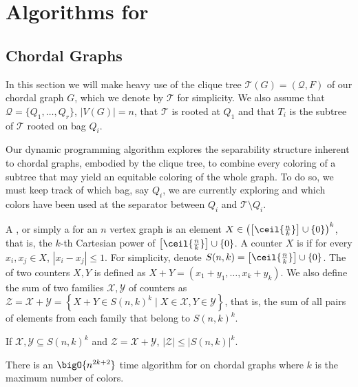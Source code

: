 \section{Algorithms for }

\subsection{Chordal Graphs}

In this section we will make heavy use of the clique tree $\mathcal{T}(G) = (\mathcal{Q}, F)$ of our chordal graph $G$, which we denote by $\mathcal{T}$ for simplicity.
We also assume that $\mathcal{Q} = \{Q_1, \dots, Q_r\}$, $|V(G)| = n$, that $\mathcal{T}$ is rooted at $Q_1$ and that $T_i$ is the subtree of $\mathcal{T}$ rooted on bag $Q_i$.

Our dynamic programming algorithm explores the separability structure inherent to chordal graphs, embodied by the clique tree, to combine every coloring of a subtree that may yield an equitable coloring of the whole graph.
To do so, we must keep track of which bag, say $Q_i$, we are currently exploring and which colors have been used at the separator between $Q_i$ and $\mathcal{T} \setminus Q_i$.

A , or simply a  for an $n$ vertex graph is an element $X \in \left(\left[\ceil{\frac{n}{k}}\right] \cup \{0\}\right)^k$, that is, the $k$-th Cartesian power of $\left[\ceil{\frac{n}{k}}\right] \cup \{0\}$.
A counter $X$ is  if for every $x_i, x_j \in X$, $|x_i - x_j| \leq 1$.
For simplicity, denote $S(n,k) = \left[\ceil{\frac{n}{k}}\right] \cup \{0\}$.
The  of two counters $X,Y$ is defined as $X + Y = (x_1 + y_1, \dots, x_k + y_k)$.
We also define the sum of two families $\mathcal{X}, \mathcal{Y}$ of counters as $\mathcal{Z} = \mathcal{X} + \mathcal{Y} = \left\{X + Y \in S(n,k)^k \mid X \in \mathcal{X}, Y \in \mathcal{Y} \right\}$, that is, the sum of all pairs of elements from each family that belong to $S(n,k)^k$.

\begin{observation}
    \label{obs:counter_bound}
    If $\mathcal{X}, \mathcal{Y} \subseteq S(n,k)^k$ and $\mathcal{Z} = \mathcal{X} + \mathcal{Y}$, $|\mathcal{Z}| \leq |S(n,k)|^k $.
\end{observation}

\begin{theorem}
    \label{thm:chordal_exp}
    There is an $\bigO{n^{2k+2}}$ time algorithm for  on chordal graphs where $k$ is the maximum number of colors.
\end{theorem}

